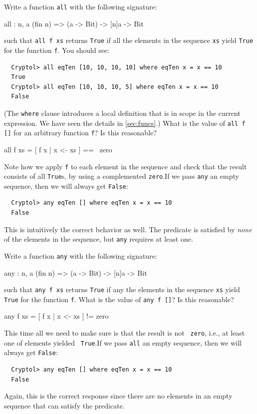 \begin{Exercise}\label{ex:zero:1}
Write a function {\tt all} with the following signature:\indAll
\begin{code}
  all : {n, a} (fin n) => (a -> Bit) -> [n]a -> Bit
\end{code}
such that {\tt all f xs} returns {\tt True} if all the elements in the
sequence {\tt xs} yield {\tt True} for the function {\tt f}.
 You should see:
\begin{Verbatim}
  Cryptol> all eqTen [10, 10, 10, 10] where eqTen x = x == 10
  True
  Cryptol> all eqTen [10, 10, 10, 5] where eqTen x = x == 10
  False
\end{Verbatim}
(The {\tt where} clause introduces a local definition that is in scope
in the current expression. We have seen the details in
\autoref{sec:funcs}.\indWhere) What is the value of {\tt all f []}
for an arbitrary function {\tt f}? Is this reasonable?
\end{Exercise}
\begin{Answer}
\begin{code}
  all f xs = [ f x | x <- xs ] == ~zero
\end{code}
Note how we apply {\tt f} to each element in the sequence and check
that the result consists of all {\tt True}s, by using a complemented
{\tt zero}.\indZero\indAll If we pass {\tt any} an empty sequence,
then we will always get {\tt False}:
\begin{Verbatim}
  Cryptol> any eqTen [] where eqTen x = x == 10
  False
\end{Verbatim}
This is intuitively the correct behavior as well. The predicate is
satisfied by {\em none} of the elements in the sequence, but {\tt any}
requires at least one.
\end{Answer}

\begin{Exercise}\label{ex:zero:2}
Write a function {\tt any} with the following signature:\indAny
\begin{code}
  any : {n, a} (fin n) => (a -> Bit) -> [n]a -> Bit
\end{code}
such that {\tt any f xs} returns {\tt True} if any the elements in the
sequence {\tt xs} yield {\tt True} for the function {\tt f}. What is
the value of {\tt any f []}? Is this reasonable?
\end{Exercise}
\begin{Answer}
\begin{code}
  any f xs = [ f x | x <- xs ] != zero
\end{code}
This time all we need to make sure is that the result is not {\tt
  zero}, i.e., at least one of elements yielded {\tt
  True}.\indZero\indTrue\indAny If we pass {\tt all} an empty
sequence, then we will always get {\tt False}:
\begin{Verbatim}
  Cryptol> any eqTen [] where eqTen x = x == 10
  False
\end{Verbatim}
Again, this is the correct response since there are no elements in an
empty sequence that can satisfy the predicate.
\end{Answer}

